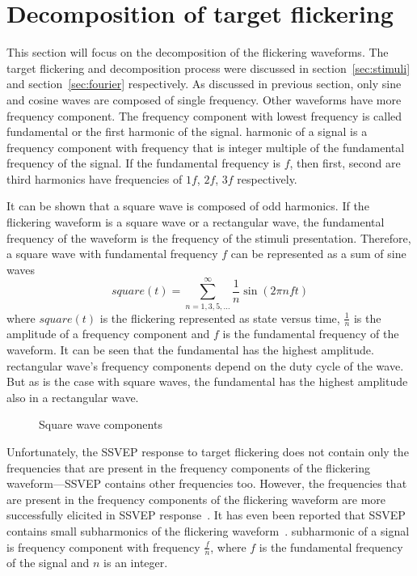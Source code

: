 
\section{Decomposition of target flickering}
\label{sec:decomposition}

This section will focus on the decomposition of the \glspl{flickering waveform}. The \gls{target} \gls{flickering} and decomposition process were discussed in section~\ref{sec:stimuli} and section~\ref{sec:fourier} respectively. As discussed in previous section, only sine and cosine waves are composed of single frequency. Other waveforms have more \gls{frequency component}. The \gls{frequency component} with lowest frequency is called \gls{fundamental} or the first \gls{harmonic} of the signal. \Gls{harmonic} of a signal is a \gls{frequency component} with frequency that is integer multiple of the \gls{fundamental} frequency of the signal. If the \gls{fundamental} frequency is $f$, then first, second are third \glspl{harmonic} have frequencies of $1f$, $2f$, $3f$ respectively.

It can be shown that a \gls{square wave} is composed of odd \glspl{harmonic}. If the \gls{flickering waveform} is a \gls{square wave} or a \gls{rectangular wave}, the \gls{fundamental} frequency of the waveform is the frequency of the stimuli presentation. Therefore, a \gls{square wave} with \gls{fundamental} frequency $f$ can be represented as a sum of sine waves
\begin{equation}
	\label{eq:square}
	square(t) = \sum_{n=1,3,5,\dots}^{\infty}\frac{1}{n} \sin(2\pi nft)
\end{equation}
where $square(t)$ is the \gls{flickering} represented as \gls{state} versus time, $\frac{1}{n}$ is the amplitude of a \gls{frequency component} and $f$ is the \gls{fundamental} frequency of the waveform. It can be seen that the \gls{fundamental} has the highest amplitude. \Gls{rectangular wave}'s \glspl{frequency component} depend on the \gls{duty cycle} of the wave. But as is the case with \glspl{square wave}, the \gls{fundamental} has the highest amplitude also in a \gls{rectangular wave}.

\begin{figure}[h]
	
	\caption{Square wave components}
\end{figure}

Unfortunately, the \gls{SSVEP} response to \gls{target} \gls{flickering} does not contain only the frequencies that are present in the \glspl{frequency component} of the \gls{flickering waveform}---\gls{SSVEP} contains other frequencies too. However, the frequencies that are present in the \glspl{frequency component} of the \gls{flickering waveform} are more successfully elicited in \gls{SSVEP} response~\cite{square_sine}. It has even been reported that \gls{SSVEP} contains small \glspl{subharmonic} of the \gls{flickering waveform}~\cite{ssvep_response}. \Gls{subharmonic} of a signal is \gls{frequency component} with frequency $\frac{f}{n}$, where $f$ is the \gls{fundamental} frequency of the signal and $n$ is an integer.

